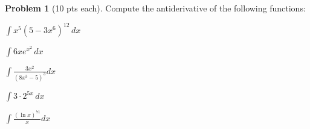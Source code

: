\documentclass[12pt]{article}
\theoremstyle{definition}
\newtheorem{problem}{Problem}
\begin{document}
\bigskip
\begin{problem}[10 pts each]
Compute the antiderivative of the following functions:
\item $\displaystyle{\int x^5 (5 - 3x^6)^{12}\, dx}$
\vspace{3.5cm}
\item $\displaystyle{\int  6x e^{x^2} \, dx}$
\vspace{3.5cm}
\item $\displaystyle{\int \frac{3x^2}{(8x^3-5)^3} dx}$
\vspace{3.5cm}
\item $\displaystyle{\int 3 \cdot 2^{5x}\, dx}$
\vspace{3.5cm}
\item $\displaystyle{\int \frac{(\ln x)^{71}}{x} dx}$
\vspace{3.5cm}
\end{problem}
\end{document}
